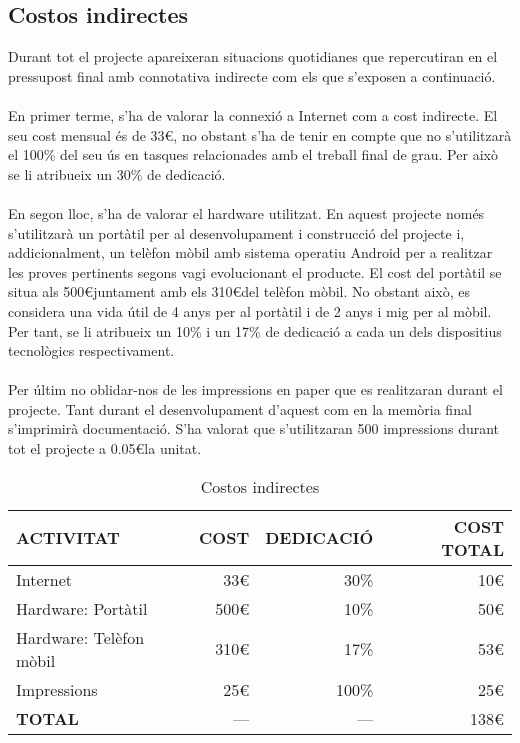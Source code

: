 \subsection{Costos indirectes}

Durant tot el projecte apareixeran situacions quotidianes que repercutiran en el pressupost final amb connotativa indirecte com els que s’exposen a continuació.
\\\\
En primer terme, s’ha de valorar la connexió a Internet com a cost indirecte. El seu cost mensual és de 33\euro, no obstant s’ha de tenir en compte que no s’utilitzarà el 100\% del seu ús en tasques relacionades amb el treball final de grau. Per això se li atribueix un 30\% de dedicació.
\\\\
En segon lloc, s’ha de valorar el hardware utilitzat. En aquest projecte només s’utilitzarà un portàtil per al desenvolupament i construcció del projecte i, addicionalment, un telèfon mòbil amb sistema operatiu Android per a realitzar les proves pertinents segons vagi evolucionant el producte. El cost del portàtil se situa als 500\euro\space juntament amb els 310\euro\space del telèfon mòbil. No obstant això, es considera una vida útil de 4 anys per al portàtil i de 2 anys i mig per al mòbil. Per tant, se li atribueix un 10\% i un 17\% de dedicació a cada un dels dispositius tecnològics respectivament.
\\\\
Per últim no oblidar-nos de les impressions en paper que es realitzaran durant el projecte. Tant durant el desenvolupament d’aquest com en la memòria final s’imprimirà documentació. S’ha valorat que s’utilitzaran 500 impressions durant tot el projecte a 0.05\euro\space la unitat.
\\
\begin{table}[H]
\centering
\begin{tabular}{ | l | r | r | r |}
\hline
\textbf{ACTIVITAT}&\textbf{COST}&\textbf{DEDICACIÓ}&\textbf{COST TOTAL} 		\\ \hline
Internet						 	& 33\euro	& 30\%			& 10\euro			\\ \hline
Hardware: Portàtil				 	& 500\euro	& 10\%			& 50\euro			\\ \hline
Hardware: Telèfon mòbil			 	& 310\euro	& 17\%			& 53\euro			\\ \hline
Impressions						 	& 25\euro	& 100\%			& 25\euro			\\ \hline
\textbf{TOTAL}					 	& --- 		& ---			& 138\euro			\\ 
\hline
\end{tabular}
\caption{Costos indirectes}
\end{table}

